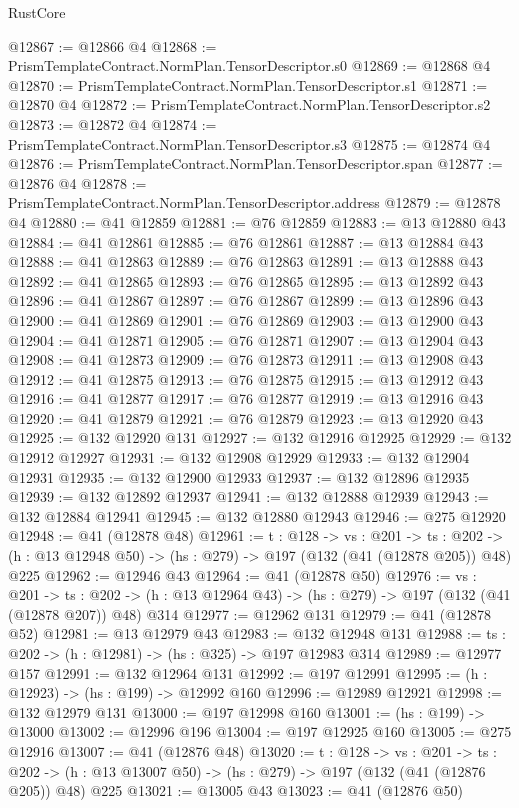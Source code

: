 \begin{lexlean}{RustCore}
\begin{coremodule}
@12867 := @12866 @4
@12868 := PrismTemplateContract.NormPlan.TensorDescriptor.s0
@12869 := @12868 @4
@12870 := PrismTemplateContract.NormPlan.TensorDescriptor.s1
@12871 := @12870 @4
@12872 := PrismTemplateContract.NormPlan.TensorDescriptor.s2
@12873 := @12872 @4
@12874 := PrismTemplateContract.NormPlan.TensorDescriptor.s3
@12875 := @12874 @4
@12876 := PrismTemplateContract.NormPlan.TensorDescriptor.span
@12877 := @12876 @4
@12878 := PrismTemplateContract.NormPlan.TensorDescriptor.address
@12879 := @12878 @4
@12880 := @41 @12859
@12881 := @76 @12859
@12883 := @13 @12880 @43
@12884 := @41 @12861
@12885 := @76 @12861
@12887 := @13 @12884 @43
@12888 := @41 @12863
@12889 := @76 @12863
@12891 := @13 @12888 @43
@12892 := @41 @12865
@12893 := @76 @12865
@12895 := @13 @12892 @43
@12896 := @41 @12867
@12897 := @76 @12867
@12899 := @13 @12896 @43
@12900 := @41 @12869
@12901 := @76 @12869
@12903 := @13 @12900 @43
@12904 := @41 @12871
@12905 := @76 @12871
@12907 := @13 @12904 @43
@12908 := @41 @12873
@12909 := @76 @12873
@12911 := @13 @12908 @43
@12912 := @41 @12875
@12913 := @76 @12875
@12915 := @13 @12912 @43
@12916 := @41 @12877
@12917 := @76 @12877
@12919 := @13 @12916 @43
@12920 := @41 @12879
@12921 := @76 @12879
@12923 := @13 @12920 @43
@12925 := @132 @12920 @131
@12927 := @132 @12916 @12925
@12929 := @132 @12912 @12927
@12931 := @132 @12908 @12929
@12933 := @132 @12904 @12931
@12935 := @132 @12900 @12933
@12937 := @132 @12896 @12935
@12939 := @132 @12892 @12937
@12941 := @132 @12888 @12939
@12943 := @132 @12884 @12941
@12945 := @132 @12880 @12943
@12946 := @275 @12920
@12948 := @41 (@12878 @48)
@12961 := {t : @128} ->
  {vs : @201} ->
  {ts : @202} -> (h : @13 @12948 @50) -> (hs : @279) -> @197 (@132 (@41 (@12878 @205)) @48) @225
@12962 := @12946 @43
@12964 := @41 (@12878 @50)
@12976 := {vs : @201} ->
  {ts : @202} -> (h : @13 @12964 @43) -> (hs : @279) -> @197 (@132 (@41 (@12878 @207)) @48) @314
@12977 := @12962 @131
@12979 := @41 (@12878 @52)
@12981 := @13 @12979 @43
@12983 := @132 @12948 @131
@12988 := {ts : @202} -> (h : @12981) -> (hs : @325) -> @197 @12983 @314
@12989 := @12977 @157
@12991 := @132 @12964 @131
@12992 := @197 @12991
@12995 := (h : @12923) -> (hs : @199) -> @12992 @160
@12996 := @12989 @12921
@12998 := @132 @12979 @131
@13000 := @197 @12998 @160
@13001 := (hs : @199) -> @13000
@13002 := @12996 @196
@13004 := @197 @12925 @160
@13005 := @275 @12916
@13007 := @41 (@12876 @48)
@13020 := {t : @128} ->
  {vs : @201} ->
  {ts : @202} -> (h : @13 @13007 @50) -> (hs : @279) -> @197 (@132 (@41 (@12876 @205)) @48) @225
@13021 := @13005 @43
@13023 := @41 (@12876 @50)

\end{coremodule}
\end{lexlean}
